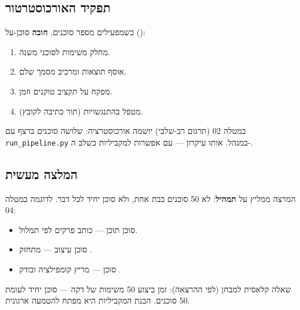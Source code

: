 \subsection{תפקיד האורכוסטרטור}

כשמפעילים מספר סוכנים, \textbf{חובה} סוכן-על ():
\begin{enumerate}[rightmargin=2em]
  \item מחלק משימות לסוכני משנה.
  \item אוסף תוצאות ומרכיב מסמך שלם.
  \item מפקח על תקציב טוקנים וזמן.
  \item מטפל בהתנגשויות (תור כתיבה לקובץ).
\end{enumerate}

\begin{notebox}
במטלה 02 (תרגום רב-שלבי) יושמה אורכוסטרציה: שלושה סוכנים ברצף עם
\texttt{run\_pipeline.py} כמנהל. אותו עיקרון --- עם אפשרות למקביליות
בשלב ה-.
\end{notebox}


\subsection{המלצה מעשית}

המרצה ממליץ על \textbf{תמהיל}: לא 50 סוכנים בבת אחת, ולא סוכן יחיד
לכל דבר. לדוגמה במטלה 04:
\begin{itemize}[rightmargin=2em]
  \item סוכן תוכן --- כותב פרקים לפי תמלול.
  \item סוכן עיצוב --- מתחזק .
  \item סוכן  --- מריץ קומפילציה ובודק .
\end{itemize}

\begin{insightbox}
שאלה קלאסית למבחן (לפי ההרצאה): זמן ביצוע 50 משימות של דקה ---
סוכן יחיד לעומת 50 סוכנים. הבנת המקביליות היא מפתח להטמעה ארגונית.
\end{insightbox}
